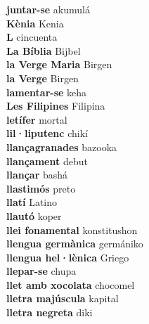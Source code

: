 \textbf{ juntar-se  } akumulá \\
\textbf{ Kènia  } Kenia \\
\textbf{ L  } cincuenta \\
\textbf{ La Bíblia  } Bijbel \\
\textbf{ la Verge Maria  } Birgen \\
\textbf{ la Verge  } Birgen \\
\textbf{ lamentar-se  } keha \\
\textbf{ Les Filipines  } Filipina \\
\textbf{ letífer  } mortal \\
\textbf{ lil·liputenc  } chikí \\
\textbf{ llançagranades  } bazooka \\
\textbf{ llançament  } debut \\
\textbf{ llançar  } bashá \\
\textbf{ llastimós  } preto \\
\textbf{ llatí  } Latino \\
\textbf{ llautó  } koper \\
\textbf{ llei fonamental  } konstitushon \\
\textbf{ llengua germànica  } germániko \\
\textbf{ llengua hel·lènica  } Griego \\
\textbf{ llepar-se  } chupa \\
\textbf{ llet amb xocolata  } chocomel \\
\textbf{ lletra majúscula  } kapital \\
\textbf{ lletra negreta  } diki \\
